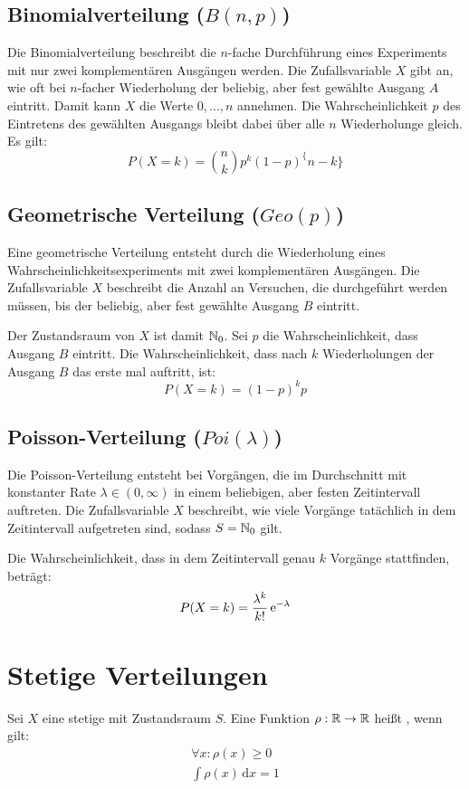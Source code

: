 \subsection{Binomialverteilung ($B(n,p)$)}

Die Binomialverteilung beschreibt die $n$-fache Durchführung eines Experiments
mit nur zwei komplementären Ausgängen werden. Die Zufallsvariable $X$ gibt an,
wie oft bei $n$-facher Wiederholung der beliebig, aber fest gewählte Ausgang $A$
eintritt. Damit kann $X$ die Werte $0, ..., n$ annehmen. Die Wahrscheinlichkeit
$p$ des Eintretens des gewählten Ausgangs bleibt dabei über alle $n$
Wiederholunge gleich. Es gilt:
\[P(X=k) = \binom{n}{k}p^k(1-p)^\{n-k\}\]


\subsection{Geometrische Verteilung ($Geo(p)$)}

Eine geometrische Verteilung entsteht durch die Wiederholung eines
Wahrscheinlichkeitsexperiments mit zwei komplementären Ausgängen. Die
Zufallsvariable $X$ beschreibt die Anzahl an Versuchen, die durchgeführt werden
müssen, bis der beliebig, aber fest gewählte Ausgang $B$ eintritt.

Der Zustandsraum von $X$ ist damit $\mathbb{N}_0$. Sei $p$ die Wahrscheinlichkeit, dass
Ausgang $B$ eintritt. Die Wahrscheinlichkeit, dass nach $k$ Wiederholungen der
Ausgang $B$ das erste mal auftritt, ist:
\[P(X=k) = (1-p)^kp\]


\subsection{Poisson-Verteilung ($Poi(\lambda)$)}

Die Poisson-Verteilung entsteht bei Vorgängen, die im Durchschnitt mit
konstanter Rate $\lambda \in (0, \infty)$ in einem beliebigen, aber
festen Zeitintervall auftreten. Die Zufallsvariable $X$ beschreibt, wie viele
Vorgänge tatächlich in dem Zeitintervall aufgetreten sind, sodass $S=\mathbb{N}_0$ gilt.

Die Wahrscheinlichkeit, dass in dem Zeitintervall genau $k$ Vorgänge
stattfinden, beträgt:
\[P(X=k) = \frac{\lambda^k}{k!}\,\mathrm{e}^{-\lambda}\]


\section{Stetige Verteilungen}

\begin{definition}[Wahrscheinlichkeitsdichte]\label{def:dichte}
Sei $X$ eine stetige  mit Zustandsraum $S$.
Eine Funktion $\rho: \mathbb{R} \rightarrow \mathbb{R}$ heißt ,
wenn gilt:
\begin{align*}
  \forall x: \rho(x) \ge 0 \\
  \int \rho(x) \,\mathrm{d}x = 1
\end{align*}
\end{definition}

